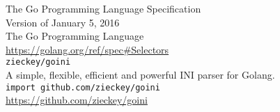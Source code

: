 \documentclass[12pt,letterpaper,dvips]{article}
\begin{document}
\noindent The Go Programming Language Specification\\
Version of January 5, 2016\\
The Go Programming Language\\
\href{https://golang.org/ref/spec\#Selectors}{https://golang.org/ref/spec\#Selectors}
\\


\newpage
\noindent \texttt{zieckey/goini}\\
A simple, flexible, efficient and powerful INI parser for Golang.\\
\texttt{import github.com/zieckey/goini}\\
\href{https://github.com/zieckey/goini}{https://github.com/zieckey/goini}
\end{document}
